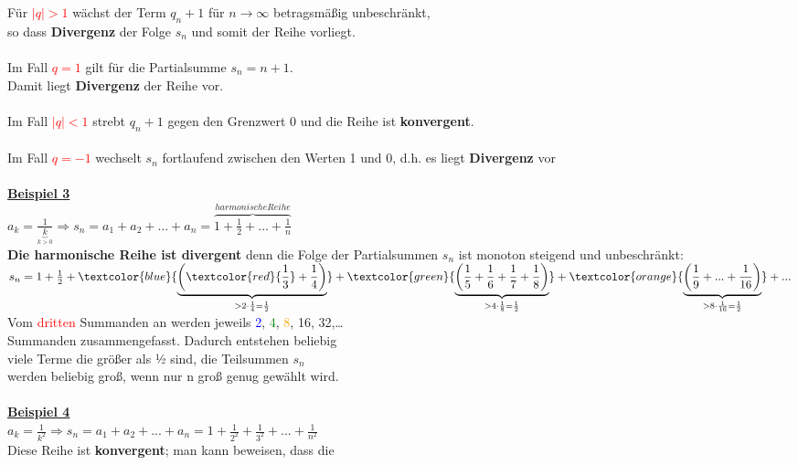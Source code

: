 \documentclass[12pt,a4paper]{article}
\begin{document}
Für \textcolor{red}{$|q|>1$} wächst der Term $q_n+1$ für $n\rightarrow\infty$ betragsmäßig unbeschränkt,\\ so dass \textbf{Divergenz} der Folge $s_n$ und somit der Reihe vorliegt.
\\
\\
Im Fall \textcolor{red}{$q=1$} gilt für die Partialsumme $s_n=n+1$.\\Damit liegt \textbf{Divergenz} der Reihe vor.
\\
\\
Im Fall \textcolor{red}{$|q|<1$} strebt $q_n+1$ gegen den Grenzwert 0 und die Reihe ist \textbf{konvergent}.
\\
\\
Im Fall \textcolor{red}{$q=-1$} wechselt $s_n$ fortlaufend zwischen den Werten 1 und 0, d.h. es liegt \textbf{Divergenz} vor
\\
\\
\underline{\textbf{Beispiel 3}}\\
$a_k=\frac{1}{\underbrace{k}_{k>0}}\Rightarrow s_n=a_1+a_2+...+a_n=\overbrace{1+\frac{1}{2}+...+\frac{1}{n}}^{harmonische Reihe}$\\
\textbf{Die harmonische Reihe ist divergent} denn die Folge der Partialsummen $s_n$ ist monoton steigend und unbeschränkt:\\
$s_n=1+\frac{1}{2}+\textcolor{blue}{\underbrace{\biggl(\textcolor{red}{\frac{1}{3}}+\frac{1}{4}\biggr)}_{>2\cdot\frac{1}{4}=\frac{1}{2}}}+\textcolor{green}{\underbrace{\biggl(\frac{1}{5}+\frac{1}{6}+\frac{1}{7}+\frac{1}{8}\biggr)}_{>4\cdot\frac{1}{8}=\frac{1}{2}}}+\textcolor{orange}{\underbrace{\biggl(\frac{1}{9}+...+\frac{1}{16}\biggr)}_{>8\cdot\frac{1}{16}=\frac{1}{2}}}+...$
\\
Vom \textcolor{red}{dritten} Summanden an werden jeweils \textcolor{blue}{2}, \textcolor{green}{4}, \textcolor{orange}{8}, 16, 32,…\\
Summanden zusammengefasst. Dadurch entstehen beliebig\\
viele Terme die größer als ½ sind, die Teilsummen $s_n$\\
werden beliebig groß, wenn nur n groß genug gewählt wird. \\
\\
\underline{\textbf{Beispiel 4}}\\
$a_k=\frac{1}{k^2}\Rightarrow s_n=a_1+a_2+...+a_n=1+\frac{1}{2^2}+\frac{1}{3^2}+...+\frac{1}{n^2}$
\\
Diese Reihe ist \textbf{konvergent}; man kann beweisen, dass die\\
\end{document}
